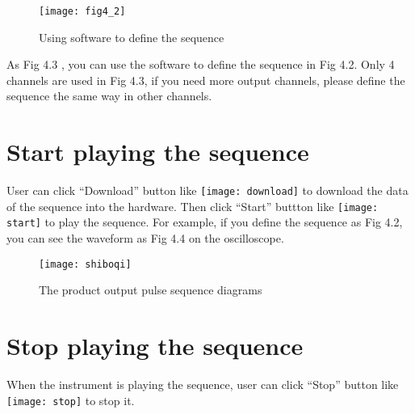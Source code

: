 \vspace{1cm}
\begin{figure}[H]
\centering
\texttt{[image: fig4\_2]}
\caption{Using software to define the sequence}
\end{figure}
\vspace{0.6cm}
As Fig 4.3 , you can use the software to define the sequence in Fig 4.2. Only 4 channels are used in Fig 4.3, if you need more output channels, please define the sequence the same way in other channels.

\newpage
\section{\heiti Start playing the sequence}
User can click “Download” button like \texttt{[image: download]} to download the data of the sequence into the hardware. Then click “Start” buttton like \texttt{[image: start]} to play the sequence. For example, if you define the sequence as Fig 4.2, you can see the waveform as Fig 4.4 on the oscilloscope.

\vspace{2cm}

\begin{figure}[htbp]
\texttt{[image: shiboqi]}
\caption{The product output pulse sequence diagrams}
\end{figure}


\section{\heiti Stop playing the sequence}
When the instrument is playing the sequence, user can click “Stop” button like \texttt{[image: stop]} to stop it.


